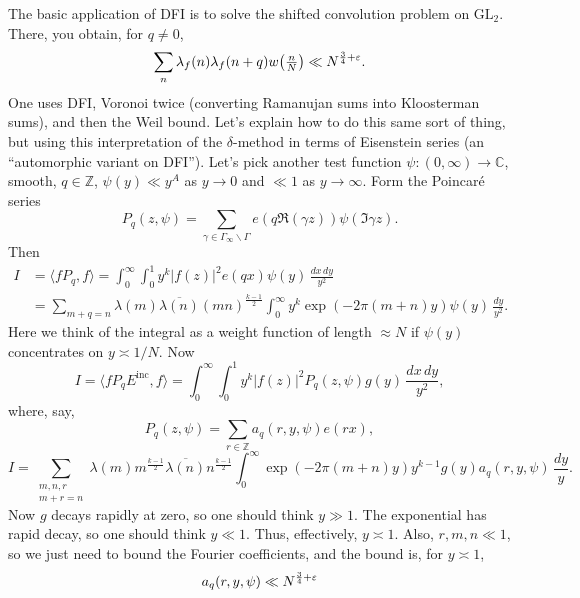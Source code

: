 \documentclass[reqno]{amsart} 
\begin{document}
The basic application of DFI is to solve the shifted convolution problem on $\mathrm{GL}_2$.  There, you obtain, for $q \neq 0$,
\begin{equation*}
  \sum_n \lambda_f(n) \lambda_f(n + q) w \bigl( \tfrac{n}{N} \bigr) \ll N^{\frac{3}{4} + \varepsilon}.
\end{equation*}
One uses DFI, Voronoi twice (converting Ramanujan sums into Kloosterman sums), and then the Weil bound.  Let's explain how to do this same sort of thing, but using this interpretation of the $\delta$-method in terms of Eisenstein series (an ``automorphic variant on DFI'').  Let's pick another test function $\psi :(0, \infty) \rightarrow \mathbb{C}$, smooth, $q \in \mathbb{Z}$, $\psi(y) \ll y^A$ as $y \rightarrow 0$ and $\ll 1$ as $y \rightarrow \infty$.  Form the Poincaré series
\begin{equation*}
  P_q(z, \psi) = \sum_{\gamma \in \Gamma_\infty \backslash \Gamma}
  e(q \Re(\gamma z))
  \psi(\Im \gamma z).
\end{equation*}
Then
\begin{align*}
  I
  &= \langle f P_q, f \rangle
    = \int_0^\infty \int_0^1 y^k \lvert f(z) \rvert^2 e(q x) \psi(y)
    \, \frac{d x \, d y}{y^2} \\
  &= \sum_{m + q = n}
    \lambda(m) \overline{\lambda(n)}
    (m n)^{\frac{k - 1}{2}}
    \int_0^\infty y^k \exp(- 2 \pi(m + n) y) \psi(y)
    \, \frac{d y}{y^2}.
\end{align*}
Here we think of the integral as a weight function of length $\approx N$ if $\psi(y)$ concentrates on $y \asymp 1/N$.  Now
\begin{equation*}
  I = \langle f P_q E^{\mathrm{inc}}, f \rangle
  = \int_0^\infty \int_0^1 y^k \lvert f(z) \rvert^2 P_q(z, \psi) g(y) \, \frac{d x \, d y}{y^2},
\end{equation*}
where, say,
\begin{equation*}
  P_q(z, \psi) = \sum_{r \in \mathbb{Z}} a_q(r, y, \psi) e(r x),
\end{equation*}
\begin{equation*}
  I = \sum_{
    \substack{
      m, n, r  \\
      m + r = n      
    }
  }
  \lambda(m) m^{\frac{k - 1}{2}}
  \overline{\lambda(n)}
  n^{\frac{k - 1}{2}}
  \int_0^\infty \exp \left( - 2 \pi(m + n) y \right) y^{k - 1}
  g(y) a_q(r, y, \psi) \, \frac{d y}{y}.
\end{equation*}
Now $g$ decays rapidly at zero, so one should think $y \gg 1$.  The exponential has rapid decay, so one should think $y \ll 1$.  Thus, effectively, $y \asymp 1$.  Also, $r, m, n \ll 1$, so we just need to bound the Fourier coefficients, and the bound is, for $y \asymp 1$,
\begin{equation*}
  a_q(r, y, \psi) \ll N^{\frac{3}{4} + \varepsilon}
\end{equation*}
\end{document}
